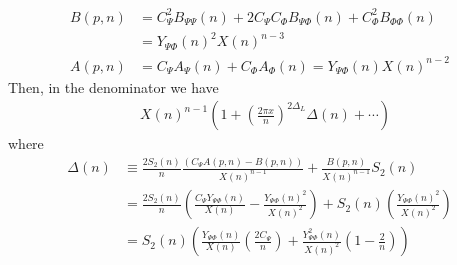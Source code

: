 \documentclass[11pt]{article}
\newcommand{\nn}{\nonumber}
\newcommand{\lb}{\left(}
\newcommand{\rb}{\right)}
\begin{document}
  \begin{align}
    B(p,n) & = C_{\Psi}^{2}B_{\Psi\Psi}(n)+2C_{\Psi}C_{\Phi}B_{\Psi\Phi}(n)+C_{\Phi}^{2}B_{\Phi\Phi}(n)\nn \\
           & =Y_{\Psi\Phi}(n)^{2}X(n)^{n-3}\nn                 \\
    A(p,n) & = C_{\Psi}A_{\Psi}(n)+C_{\Phi}A_{\Phi}(n)=Y_{\Psi\Phi}(n)X(n)^{n-2}
  \end{align}
  Then, in the denominator we have
  \begin{align}
     & X(n)^{n-1}\lb 1+\lb\frac{2\pi x}{n}\rb^{2\Delta_L}\Delta(n)+\cdots \rb
  \end{align}
  where
\begin{align}
    \Delta(n) & \equiv \frac{2S_{2}(n)}{n}\frac{(C_{\Psi}A(p,n)-B(p,n))}{X(n)^{n-1}}+\frac{B(p,n)}{X(n)^{n-1}}S_{2}(n)\nn                                                          \\
              & =\frac{2S_{2}(n)}{n}\lb \frac{C_{\Psi}Y_{\Psi\Phi}(n)}{ X(n)}-\frac{Y_{\Psi\Phi}(n)^{2}}{X(n)^{2}}\rb+S_{2}(n)\lb \frac{Y_{\Psi\Phi}(n)^{2}}{X(n)^{2}}\rb \\
              & =S_{2}(n)\lb \frac{Y_{\Psi\Phi}(n)}{X(n)}\left(\frac{2C_{\Psi}}{n}\right)+\frac{Y_{\Psi\Phi}^{2}(n)}{X(n)^{2}}\lb 1-\frac{2}{n}\rb\rb                       %
\end{align}
\end{document}
